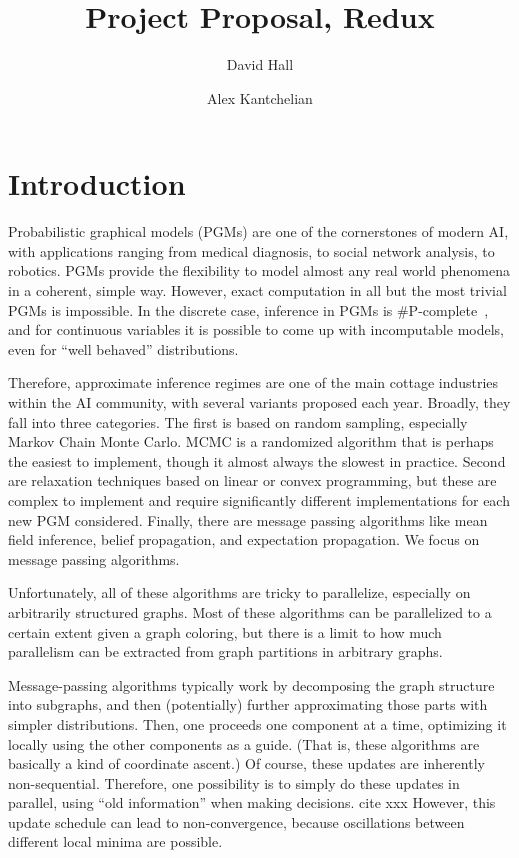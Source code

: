 \documentclass[12pt,leqno,twoside]{article}
\title{Project Proposal, Redux}
\author{David Hall \and Alex Kantchelian}
\begin{document}
\maketitle

\section{Introduction}

Probabilistic graphical models (PGMs) are one of the cornerstones
of modern AI, with applications ranging from medical diagnosis, to
social network analysis, to robotics. PGMs provide the flexibility
to model almost any real world phenomena in a coherent, simple way.
However, exact computation in all but the most trivial PGMs is
impossible. In the discrete case, inference in PGMs is
\#P-complete~\citep{Koller2009pgm}, and for continuous variables it is
possible to come up with incomputable models, even for ``well
behaved'' distributions.~\citep{AFR11}

Therefore, approximate inference regimes are one of the main cottage
industries within the AI community, with several variants proposed
each year. Broadly, they fall into three categories. The first is
based on random sampling, especially Markov Chain Monte Carlo. MCMC
is a randomized algorithm that is perhaps the easiest to implement, though
it almost always the slowest in practice. Second are relaxation techniques
based on linear or convex programming, but these are complex to implement
and require significantly different implementations for each new PGM
considered. Finally, there are message passing algorithms
like mean field inference, belief propagation, and expectation propagation.
We focus on message passing algorithms.

Unfortunately, all of these algorithms are tricky to parallelize, especially on
arbitrarily structured graphs. Most of these algorithms can be
parallelized to a certain extent given a graph coloring, but there
is a limit to how much parallelism can be extracted from graph
partitions in arbitrary graphs.

Message-passing algorithms typically work by decomposing the graph
structure into subgraphs, and then (potentially) further approximating
those parts with simpler distributions. Then, one proceeds one
component at a time, optimizing it locally using the other components
as a guide. (That is, these algorithms are basically a kind of
coordinate ascent.) Of course, these updates are inherently
non-sequential. Therefore, one possibility is to simply do these
updates in parallel, using ``old information'' when making decisions. cite xxx
However, this update schedule can lead to
non-convergence, because oscillations between different local minima
are possible.
\end{document}
